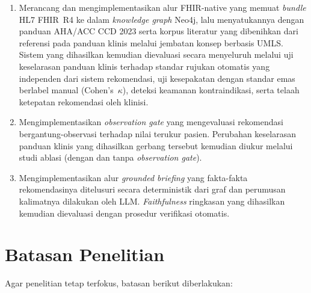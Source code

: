 \begin{enumerate}
    \item Merancang dan mengimplementasikan alur FHIR-native yang memuat \emph{bundle}
    HL7 FHIR~R4 ke dalam \emph{knowledge graph} Neo4j, lalu menyatukannya dengan panduan
    AHA/ACC CCD 2023 serta korpus literatur yang dibenihkan dari referensi pada panduan
    klinis melalui jembatan konsep berbasis UMLS. Sistem yang dihasilkan kemudian dievaluasi
    secara menyeluruh melalui uji keselarasan panduan klinis terhadap standar rujukan
    otomatis yang independen dari sistem rekomendasi, uji kesepakatan dengan standar emas
    berlabel manual (Cohen's~$\kappa$), deteksi keamanan kontraindikasi, serta telaah ketepatan
    rekomendasi oleh klinisi.
    \item Mengimplementasikan \emph{observation gate} yang mengevaluasi rekomendasi bergantung-observasi terhadap nilai
    terukur pasien. Perubahan keselarasan panduan klinis yang dihasilkan gerbang tersebut kemudian diukur melalui studi ablasi (dengan dan tanpa \emph{observation gate}).
    \item Mengimplementasikan alur \emph{grounded briefing} yang
    fakta-fakta rekomendasinya ditelusuri secara deterministik dari graf dan
    perumusan kalimatnya dilakukan oleh LLM. \emph{Faithfulness} ringkasan yang dihasilkan kemudian dievaluasi dengan prosedur verifikasi otomatis.
\end{enumerate}

\section{Batasan Penelitian}

Agar penelitian tetap terfokus, batasan berikut diberlakukan:

